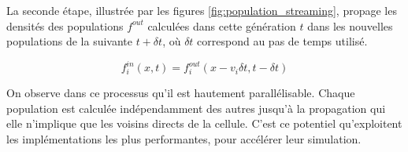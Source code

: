 La seconde étape, illustrée par les figures \ref{fig:population_streaming}, propage les densités des populations $f^{out}$ calculées dans cette génération $t$ dans les nouvelles populations de la suivante $t+\delta t$, où $\delta t$ correspond au pas de temps utilisé.

\begin{equation}
f^{in}_i(x,t) = f^{out}_i(x-v_i\delta t, t - \delta t)
\end{equation}

On observe dans ce processus qu'il est hautement parallélisable. Chaque population est calculée indépendamment des autres jusqu'à la propagation qui elle n'implique que les voisins directs de la cellule. C'est ce potentiel qu'exploitent les implémentations les plus performantes, pour accélérer leur simulation.

